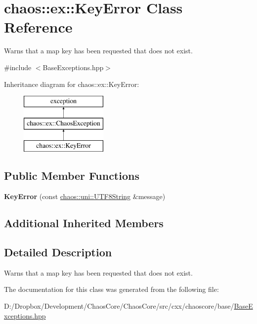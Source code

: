 \hypertarget{classchaos_1_1ex_1_1_key_error}{}\section{chaos\+:\+:ex\+:\+:Key\+Error Class Reference}
\label{classchaos_1_1ex_1_1_key_error}


Warns that a map key has been requested that does not exist.  




{\ttfamily \#include $<$Base\+Exceptions.\+hpp$>$}

Inheritance diagram for chaos\+:\+:ex\+:\+:Key\+Error\+:\begin{figure}[H]
\begin{center}
\leavevmode
\includegraphics[height=3.000000cm]{classchaos_1_1ex_1_1_key_error}
\end{center}
\end{figure}
\subsection*{Public Member Functions}
\begin{DoxyCompactItemize}
\item 
\hypertarget{classchaos_1_1ex_1_1_key_error_ab784663047d04831ecb9150672a09b18}{}{\bfseries Key\+Error} (const \hyperlink{classchaos_1_1uni_1_1_u_t_f8_string}{chaos\+::uni\+::\+U\+T\+F8\+String} \&message)\label{classchaos_1_1ex_1_1_key_error_ab784663047d04831ecb9150672a09b18}

\end{DoxyCompactItemize}
\subsection*{Additional Inherited Members}


\subsection{Detailed Description}
Warns that a map key has been requested that does not exist. 

The documentation for this class was generated from the following file\+:\begin{DoxyCompactItemize}
\item 
D\+:/\+Dropbox/\+Development/\+Chaos\+Core/\+Chaos\+Core/src/cxx/chaoscore/base/\hyperlink{_base_exceptions_8hpp}{Base\+Exceptions.\+hpp}\end{DoxyCompactItemize}
